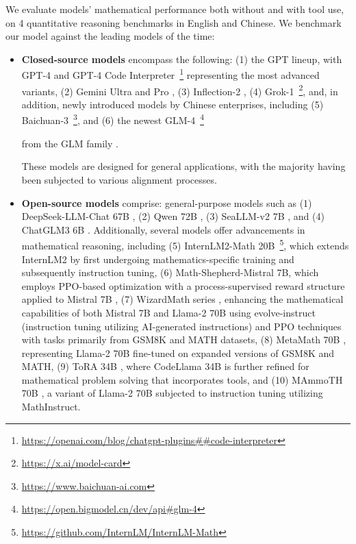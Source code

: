 \begin{itemize}[topsep=0pt]
We evaluate models' mathematical performance both without and with tool use, on 4 quantitative reasoning benchmarks in English and Chinese. We benchmark our model against the leading models of the time:

\begin{itemize}[topsep=0pt]
    \item \textbf{Closed-source models} encompass the following: (1) the GPT lineup, with GPT-4 \citep{gpt4} and GPT-4 Code Interpreter~\footnote{\url{https://openai.com/blog/chatgpt-plugins\#\#code-interpreter}} representing the most advanced variants, (2) Gemini Ultra and Pro \citep{gemini}, (3) Inflection-2 \citep{inflection-2}, (4) Grok-1~\footnote{\url{https://x.ai/model-card}}, and, in addition, newly introduced models by Chinese enterprises, including (5) Baichuan-3~\footnote{\url{https://www.baichuan-ai.com}}, and (6) the newest GLM-4~\footnote{\url{https://open.bigmodel.cn/dev/api\#glm-4}}

    from the GLM family \citep{glm}.

These models are designed for general applications, with the majority having been subjected to various alignment processes.  
\item \textbf{Open-source models} comprise: general-purpose models such as (1) DeepSeek-LLM-Chat 67B \citep{deepseek-llm}, (2) Qwen 72B \citep{qwen}, (3) SeaLLM-v2 7B \citep{seallm}, and (4) ChatGLM3 6B \citep{chatglm3}. Additionally, several models offer advancements in mathematical reasoning, including (5) InternLM2-Math 20B~\footnote{\url{https://github.com/InternLM/InternLM-Math}}, which extends InternLM2 by first undergoing mathematics-specific training and subsequently instruction tuning, (6) Math-Shepherd-Mistral 7B, which employs PPO-based optimization \citep{schulman2017proximal} with a process-supervised reward structure applied to Mistral 7B \citep{mistral}, (7) WizardMath series \citep{wizardmath}, enhancing the mathematical capabilities of both Mistral 7B and Llama-2 70B \citep{llama2} using evolve-instruct (instruction tuning utilizing AI-generated instructions) and PPO techniques with tasks primarily from GSM8K and MATH datasets, (8) MetaMath 70B \citep{metamath}, representing Llama-2 70B fine-tuned on expanded versions of GSM8K and MATH, (9) ToRA 34B \cite{tora}, where CodeLlama 34B is further refined for mathematical problem solving that incorporates tools, and (10) MAmmoTH 70B \citep{MathInstruct}, a variant of Llama-2 70B subjected to instruction tuning utilizing MathInstruct.


\end{itemize}
\end{itemize}
